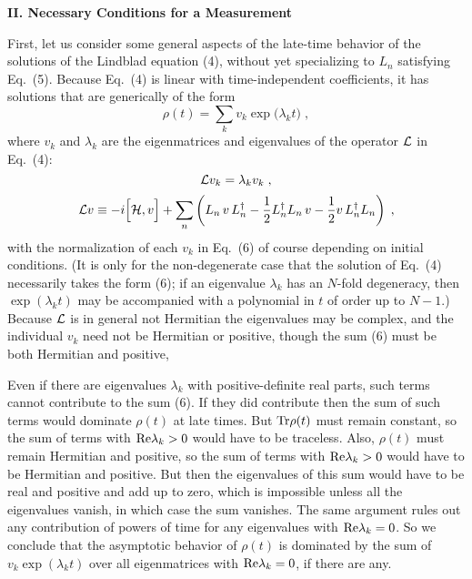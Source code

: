 \documentclass[12pt]{article}
\begin{document}
\newpage


\begin{center}
{\bf II. Necessary Conditions for a Measurement}
\end{center}

First, let us consider some general aspects of the late-time behavior of the solutions of the Lindblad equation (4), without yet specializing to $L_n$ satisfying Eq.~(5).  Because Eq.~(4) is linear with time-independent coefficients, it has solutions that are generically of the form
\begin{equation}
\rho(t)=\sum_k v_k \exp\Big(\lambda_k t\Big)\;,
\end{equation}
where $v_k$ and $\lambda_k$ are the eigenmatrices and eigenvalues of the operator ${\cal L}$ in Eq.~(4):
\begin{equation}
{\cal L}v_k=\lambda_k v_k\;,
\end{equation}
\begin{equation}
{\cal L}v\equiv -i\Big[{\cal H},v\Big]+\sum_n \left(L_n\,v\,L_n^\dagger-\frac{1}{2}L_n^\dagger L_n\, v
-\frac{1}{2}v\, L_n^\dagger L_n\right)\;,
\end{equation}
with the normalization of each $v_k$ in Eq.~(6) of course depending on initial conditions.
(It is only  for the non-degenerate case that the solution of Eq.~(4) necessarily takes the form (6); if an eigenvalue $\lambda_k$ has an $N$-fold degeneracy, then $\exp(\lambda_kt)$ may be accompanied with a polynomial in $t$ of order up to $N-1$.)  Because ${\cal L}$ is in general not Hermitian the eigenvalues may be complex, and  the individual $v_k$ need not be Hermitian or positive, though the sum (6) must be both Hermitian and positive, 

Even if there are  eigenvalues $\lambda_k$ with positive-definite real parts, such terms cannot contribute to the sum (6).  If they did contribute then the sum of such terms would dominate $\rho(t)$  at late times. But ${\rm Tr}\rho(t)$ must remain constant, so the sum of terms with ${\rm Re}\lambda_k>0$ would have to be traceless.  Also, $\rho(t)$ must remain Hermitian and positive, so the sum of terms with ${\rm Re}\lambda_k>0$ would have to be Hermitian and positive. But then the eigenvalues of this sum would have to be real and positive and add up to zero, which is impossible unless all the eigenvalues vanish, in which case the sum vanishes.  The  same argument rules out any contribution of powers of time for any eigenvalues with ${\rm Re}\lambda_k=0$.  So we conclude that the asymptotic behavior of $\rho(t)$ is dominated by the sum of $v_k\exp(\lambda_k t)$ over all eigenmatrices with ${\rm Re}\lambda_k=0$, if there are any.  
\end{document}
